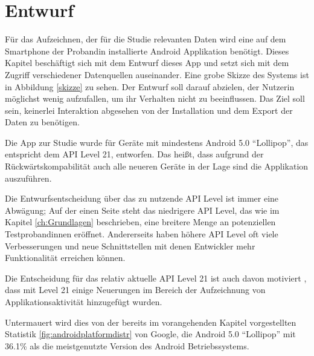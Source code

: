 
\chapter{Entwurf}
\label{ch:Entwurf}

Für das Aufzeichnen, der für die Studie relevanten Daten wird eine auf dem Smartphone der Probandin installierte Android Applikation benötigt. 
Dieses Kapitel beschäftigt sich mit dem Entwurf dieses App und setzt sich mit dem Zugriff verschiedener Datenquellen auseinander.
Eine grobe Skizze des Systems ist in Abbildung \ref{skizze} zu sehen.
Der Entwurf soll darauf abzielen, der Nutzerin möglichst wenig aufzufallen, um ihr Verhalten nicht zu beeinflussen.
Das Ziel soll sein, keinerlei Interaktion abgesehen von der Installation und dem Export der Daten zu benötigen. 
\par

Die App zur Studie wurde für Geräte mit mindestens Android 5.0 "`Lollipop"', das entspricht dem API Level 21, entworfen.
Das heißt, dass aufgrund der Rückwärtskompabilität auch alle neueren Geräte in der Lage sind die Applikation auszuführen.
\par


Die Entwurfsentscheidung über das zu nutzende API Level ist immer eine Abwägung;
Auf der einen Seite steht das niedrigere API Level, das wie im Kapitel \ref{ch:Grundlagen} beschrieben, 
eine breitere Menge an potenziellen Testprobandinnen eröffnet.
Andererseits haben höhere API Level oft viele Verbesserungen und neue Schnittstellen mit denen Entwickler mehr Funktionalität erreichen können.
\par
Die Entscheidung für das relativ aktuelle API Level 21 ist auch davon motiviert , 
dass mit Level 21 einige Neuerungen im Bereich der Aufzeichnung von Applikationsaktivität hinzugefügt wurden.

Untermauert wird dies von der bereits im vorangehenden Kapitel vorgestellten Statistik \ref{fig:androidplatformdistr}  von Google\cite{androiddistr}, 
die Android 5.0 "`Lollipop"' mit 36.1\% als die meistgenutzte Version des Android Betriebssystems.

